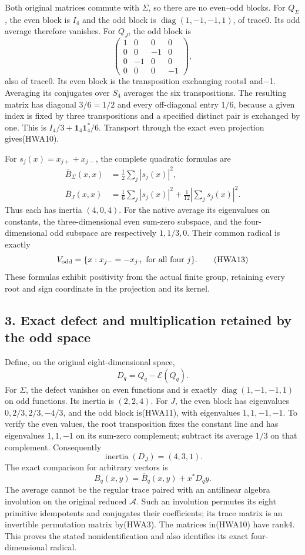 \documentclass[
  10pt,
  a4paper,
]{article}
\begin{document}
Both original matrices commute with \(\Sigma\), so there are no
even--odd blocks. For \(Q_\Sigma\), the even block is \(I_4\) and the
odd block is \(\operatorname{diag}(1,-1,-1,1)\), of trace0. Its odd
average therefore vanishes. For \(Q_J\), the odd block is \[
\begin{pmatrix}1&0&0&0\\0&0&-1&0\\0&-1&0&0\\0&0&0&-1\end{pmatrix},
\tag{HWA11}
\] also of trace0. Its even block is the transposition exchanging roots1
and−1. Averaging its conjugates over \(S_4\) averages the six
transpositions. The resulting matrix has diagonal \(3/6=1/2\) and every
off-diagonal entry \(1/6\), because a given index is fixed by three
transpositions and a specified distinct pair is exchanged by one. This
is \(I_4/3+\mathbf1_4\mathbf1_4^*/6\). Transport through the exact even
projection gives(HWA10).

For \(s_j(x)=x_{j+}+x_{j-}\), the complete quadratic formulas are \[
\begin{aligned}
\overline B_\Sigma(x,x)&=\frac12\sum_j|s_j(x)|^2,\\
\overline B_J(x,x)&=\frac16\sum_j|s_j(x)|^2
 +\frac1{12}\left|\sum_js_j(x)\right|^2.
\end{aligned}
\tag{HWA12}
\] Thus each has inertia \((4,0,4)\). For the native average its
eigenvalues on constants, the three-dimensional even sum-zero subspace,
and the four-dimensional odd subspace are respectively \(1,1/3,0\).
Their common radical is exactly \[
V_{\rm odd}=\{x:x_{j-}=-x_{j+}\ \text{for all four }j\}.
\tag{HWA13}
\] These formulas exhibit positivity from the actual finite group,
retaining every root and sign coordinate in the projection and its
kernel.

\subsection{3. Exact defect and multiplication retained by the odd
space}\label{exact-defect-and-multiplication-retained-by-the-odd-space}

Define, on the original eight-dimensional space, \[
D_q=Q_q-\mathscr E(Q_q).
\tag{HWA14}
\] For \(\Sigma\), the defect vanishes on even functions and is exactly
\(\operatorname{diag}(1,-1,-1,1)\) on odd functions. Its inertia is
\((2,2,4)\). For \(J\), the even block has eigenvalues
\(0,2/3,2/3,-4/3\), and the odd block is(HWA11), with eigenvalues
\(1,1,-1,-1\). To verify the even values, the root transposition fixes
the constant line and has eigenvalues \(1,1,-1\) on its sum-zero
complement; subtract its average \(1/3\) on that complement.
Consequently \[
\operatorname{inertia}(D_J)=(4,3,1).
\tag{HWA15}
\] The exact comparison for arbitrary vectors is \[
B_q(x,y)=\overline B_q(x,y)+x^*D_qy.
\tag{HWA16}
\] The average cannot be the regular trace paired with an antilinear
algebra involution on the original reduced \(\mathcal A\). Such an
involution permutes its eight primitive idempotents and conjugates their
coefficients; its trace matrix is an invertible permutation matrix
by(HWA3). The matrices in(HWA10) have rank4. This proves the stated
nonidentification and also identifies its exact four-dimensional
radical.
\end{document}
